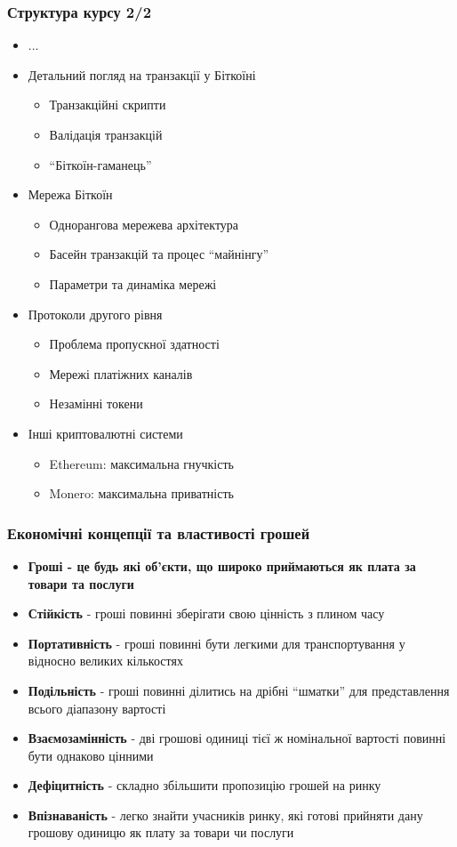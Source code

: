 \documentclass{beamer}
\begin{document}
\begin{frame}
  \frametitle{Структура курсу 2/2}
  \begin{itemize}
  \item[] ...
  \item Детальний погляд на транзакції у Біткоїні
    \begin{itemize}
    \item Транзакційні скрипти
    \item Валідація транзакцій
    \item ``Біткоїн-гаманець''
    \end{itemize}
  \item Мережа Біткоїн
    \begin{itemize}
    \item Однорангова мережева архітектура
    \item Басейн транзакцій та процес ``майнінгу''
    \item Параметри та динаміка мережі
    \end{itemize}
  \item Протоколи другого рівня
    \begin{itemize}
    \item Проблема пропускної здатності
    \item Мережі платіжних каналів
    \item Незамінні токени
    \end{itemize}
  \item Інші криптовалютні системи
    \begin{itemize}
    \item Ethereum: максимальна гнучкість
    \item Monero: максимальна приватність
    \end{itemize}
  \end{itemize}
\end{frame}

\begin{frame}
  \frametitle{Економічні концепції та властивості грошей}
  \begin{itemize}
  \item \textbf{Гроші - це будь які об'єкти, що широко приймаються як плата за
      товари та послуги}
  \item \textbf{Стійкість} - гроші повинні зберігати свою цінність з плином часу
  \item \textbf{Портативність} - гроші повинні бути легкими для транспортування
    у відносно великих кількостях
  \item \textbf{Подільність} - гроші повинні ділитись на дрібні ``шматки'' для
    представлення всього діапазону вартості
  \item \textbf{Взаємозамінність} - дві грошові одиниці тієї ж номінальної
    вартості повинні бути однаково цінними
  \item \textbf{Дефіцитність} - складно збільшити пропозицію грошей на ринку
  \item \textbf{Впізнаваність} - легко знайти учасників ринку, які готові
    прийняти дану грошову одиницю як плату за товари чи послуги
  \end{itemize}
\end{frame}
\end{document}

